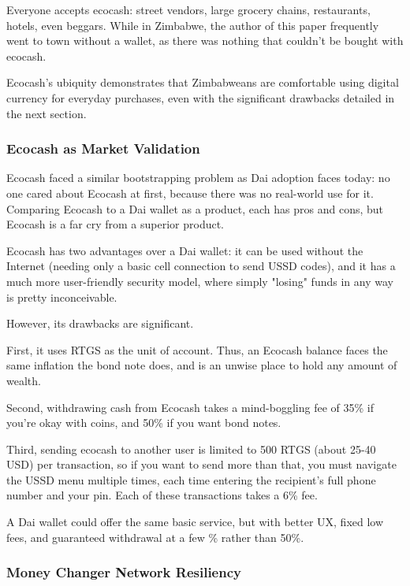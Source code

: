 \documentclass{article}
\begin{document}
Everyone accepts ecocash: street vendors, large grocery chains, restaurants, hotels, even beggars. While in Zimbabwe, the author of this paper frequently went to town without a wallet, as there was nothing that couldn't be bought with ecocash.

Ecocash's ubiquity demonstrates that Zimbabweans are comfortable using digital currency for everyday purchases, even with the significant drawbacks detailed in the next section.

\subsubsection{Ecocash as Market Validation} \label{ecocash market}

Ecocash faced a similar bootstrapping problem as Dai adoption faces today: no one cared about Ecocash at first, because there was no real-world use for it. Comparing Ecocash to a Dai wallet as a product, each has pros and cons, but Ecocash is a far cry from a superior product.

Ecocash has two advantages over a Dai wallet: it can be used without the Internet (needing only a basic cell connection to send USSD codes), and it has a much more user-friendly security model, where simply "losing" funds in any way is pretty inconceivable.

However, its drawbacks are significant.

First, it uses RTGS as the unit of account. Thus, an Ecocash balance faces the same inflation the bond note does, and is an unwise place to hold any amount of wealth.

Second, withdrawing cash from Ecocash takes a mind-boggling fee of 35\% if you're okay with coins, and 50\% if you want bond notes.

Third, sending ecocash to another user is limited to 500 RTGS (about 25-40 USD) per transaction, so if you want to send more than that, you must navigate the USSD menu multiple times, each time entering the recipient's full phone number and your pin. Each of these transactions takes a 6\% fee.

A Dai wallet could offer the same basic service, but with better UX, fixed low fees, and guaranteed withdrawal at a few \% rather than 50\%.

\subsubsection{Money Changer Network Resiliency} \label{resilient money changers}
\end{document}
